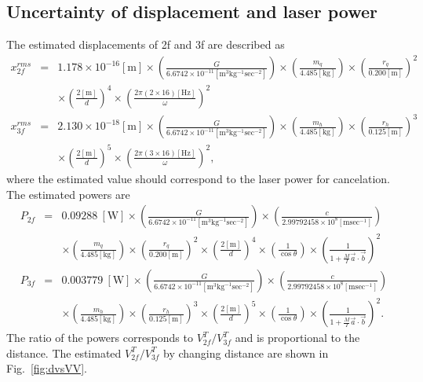 \documentclass[]{spie}  %
\begin{document}
\subsection{Uncertainty of displacement and  laser power}
 The estimated displacements of 2f and 3f are described as
\begin{eqnarray}
x^{rms}_{2f}&=&1.178 \times 10^{-16}\mathrm{[m]} \times \left( \frac{G}{6.6742 \times 10^{-11} \mathrm{[m^3kg^{-1}sec^{-2}]}} \right) \times \left( \frac{m_q}{4.485 \mathrm{[kg]}} \right) \times \left( \frac{r_q}{0.200 \mathrm{[m]}} \right)^2 \\
 &&\times \left( \frac{2\mathrm{[m]}}{d} \right)^4 \times \left( \frac{2\pi(2\times 16)\mathrm{[Hz]}}{\omega} \right)^2\\
x^{rms}_{3f}&=&2.130 \times 10^{-18}\mathrm{[m]} \times \left( \frac{G}{6.6742 \times 10^{-11} \mathrm{[m^3kg^{-1}sec^{-2}]}} \right) \times \left( \frac{m_h}{4.485 \mathrm{[kg]}} \right) \times \left( \frac{r_h}{0.125 \mathrm{[m]}} \right)^3 \\
 &&\times \left( \frac{2\mathrm{[m]}}{d} \right)^5 \times \left( \frac{2\pi(3\times 16)\mathrm{[Hz]}}{\omega} \right)^2,
\end{eqnarray}
where the estimated value should correspond to the laser power for cancelation. 
The estimated powers are
\begin{eqnarray}
P_{2f}&=&0.09288 ~\mathrm{[W]}\times \left( \frac{G}{6.6742 \times 10^{-11} \mathrm{[m^3kg^{-1}sec^{-2}]}} \right)\times \left( \frac{c}{2.99792458 \times 10^{8} \mathrm{[m sec^{-1}]}} \right)\\
&& \times \left( \frac{m_q}{4.485 \mathrm{[kg]}} \right) \times \left( \frac{r_q}{0.200 \mathrm{[m]}} \right)^2 \times \left( \frac{2\mathrm{[m]}}{d} \right)^4 \times \left( \frac{1}{\cos{\theta}} \right) \times \left( \frac{1}{1+\frac{M}{I}\vec{a}\cdot \vec{b}} \right)^2\\
P_{3f}&=&0.003779~\mathrm{[W]} \times \left( \frac{G}{6.6742 \times 10^{-11} \mathrm{[m^3kg^{-1}sec^{-2}]}} \right)\times \left( \frac{c}{2.99792458 \times 10^{8} \mathrm{[m sec^{-1}]}} \right)\\
&& \times \left( \frac{m_h}{4.485 \mathrm{[kg]}} \right) \times \left( \frac{r_h}{0.125 \mathrm{[m]}} \right)^3 \times \left( \frac{2\mathrm{[m]}}{d} \right)^5 \times \left( \frac{1}{\cos{\theta}} \right) \times \left( \frac{1}{1+\frac{M}{I}\vec{a}\cdot \vec{b}} \right)^2.
\end{eqnarray}
The ratio of the powers corresponds to $V^T_{2f}/V^{T}_{3f}$ and is proportional to the distance. The estimated $V^T_{2f}/V^{T}_{3f}$ by changing distance are shown in Fig.~\ref{fig:dvsVV}.
\end{document}
